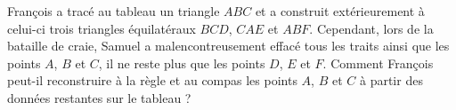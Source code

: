 François a tracé au tableau un triangle $ABC$ et a construit extérieurement à celui-ci trois triangles équilatéraux $BCD$, $CAE$ et $ABF$. Cependant, lors de la bataille de craie, Samuel a malencontreusement effacé tous les traits ainsi que les points $A$, $B$ et $C$, il ne reste plus que les points $D$, $E$ et $F$. Comment François peut-il reconstruire à la règle et au compas les points $A$, $B$ et $C$ à partir des données restantes sur le tableau ?
